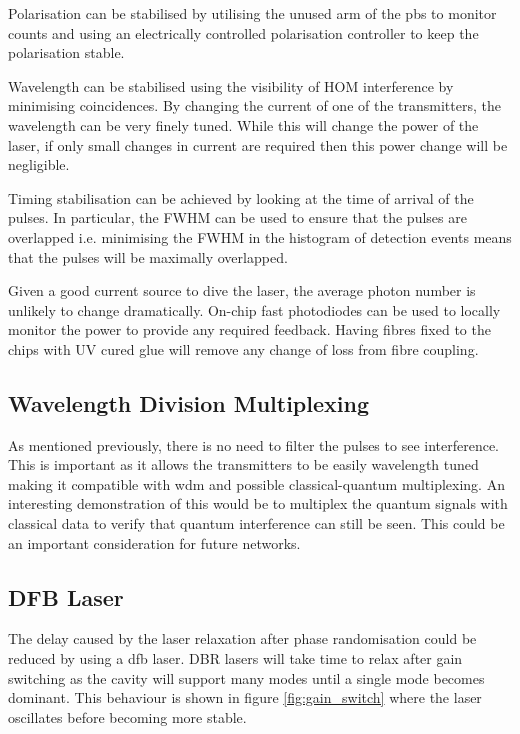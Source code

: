 Polarisation can be stabilised by utilising the unused arm of the \ac{pbs} to monitor counts and using an electrically controlled polarisation controller to keep the polarisation stable.

Wavelength can be stabilised using the visibility of \ac{HOM} interference by minimising coincidences. By changing the current of one of the transmitters, the wavelength can be very finely tuned. While this will change the power of the laser, if only small changes in current are required then this power change will be negligible.

Timing stabilisation can be achieved by looking at the time of arrival of the pulses. In particular, the \ac{FWHM} can be used to ensure that the pulses are overlapped i.e. minimising the \ac{FWHM} in the histogram of detection events means that the pulses will be maximally overlapped.

Given a good current source to dive the laser, the average photon number is unlikely to change dramatically. On-chip fast photodiodes can be used to locally monitor the power to provide any required feedback. Having fibres fixed to the chips with UV cured glue will remove any change of loss from fibre coupling.

%

\subsection{Wavelength Division Multiplexing}

As mentioned previously, there is no need to filter the pulses to see interference. This is important as it allows the transmitters to be easily wavelength tuned making it compatible with \ac{wdm} and possible classical-quantum multiplexing. An interesting demonstration of this would be to multiplex the quantum signals with classical data to verify that quantum interference can still be seen. This could be an important consideration for future networks.

\subsection{DFB Laser}

The delay caused by the laser relaxation after phase randomisation could be reduced by using a \ac{dfb} laser. \ac{DBR} lasers will take time to relax after gain switching as the cavity will support many modes until a single mode becomes dominant. This behaviour is shown in figure \ref{fig:gain_switch} where the laser oscillates before becoming more stable. 

